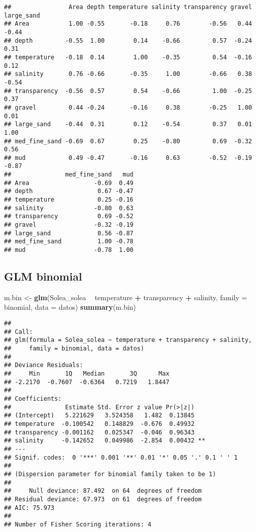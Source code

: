 \documentclass[
]{book}
\newenvironment{Shaded}{\begin{snugshade}}{\end{snugshade}}
\newcommand{\DataTypeTok}[1]{\textcolor[rgb]{0.13,0.29,0.53}{#1}}
\newcommand{\KeywordTok}[1]{\textcolor[rgb]{0.13,0.29,0.53}{\textbf{#1}}}
\newcommand{\NormalTok}[1]{#1}
\newcommand{\OperatorTok}[1]{\textcolor[rgb]{0.81,0.36,0.00}{\textbf{#1}}}
\newcommand{\StringTok}[1]{\textcolor[rgb]{0.31,0.60,0.02}{#1}}
\begin{document}
\begin{verbatim}
##                Area depth temperature salinity transparency gravel large_sand
## Area           1.00 -0.55       -0.18     0.76        -0.56   0.44      -0.44
## depth         -0.55  1.00        0.14    -0.66         0.57  -0.24       0.31
## temperature   -0.18  0.14        1.00    -0.35         0.54  -0.16       0.12
## salinity       0.76 -0.66       -0.35     1.00        -0.66   0.38      -0.54
## transparency  -0.56  0.57        0.54    -0.66         1.00  -0.25       0.37
## gravel         0.44 -0.24       -0.16     0.38        -0.25   1.00       0.01
## large_sand    -0.44  0.31        0.12    -0.54         0.37   0.01       1.00
## med_fine_sand -0.69  0.67        0.25    -0.80         0.69  -0.32       0.56
## mud            0.49 -0.47       -0.16     0.63        -0.52  -0.19      -0.87
##               med_fine_sand   mud
## Area                  -0.69  0.49
## depth                  0.67 -0.47
## temperature            0.25 -0.16
## salinity              -0.80  0.63
## transparency           0.69 -0.52
## gravel                -0.32 -0.19
## large_sand             0.56 -0.87
## med_fine_sand          1.00 -0.78
## mud                   -0.78  1.00
\end{verbatim}

\hypertarget{glm-binomial}{%
\subsection{GLM binomial}\label{glm-binomial}}

\begin{Shaded}
\begin{Highlighting}[]
\NormalTok{m.bin <-}\StringTok{ }\KeywordTok{glm}\NormalTok{(Solea_solea }\OperatorTok{~}\StringTok{ }\NormalTok{temperature }\OperatorTok{+}\StringTok{ }\NormalTok{transparency }\OperatorTok{+}\StringTok{ }\NormalTok{salinity, }\DataTypeTok{family =}\NormalTok{ binomial, }\DataTypeTok{data =}\NormalTok{ datos)}
\KeywordTok{summary}\NormalTok{(m.bin)}
\end{Highlighting}
\end{Shaded}

\begin{verbatim}
## 
## Call:
## glm(formula = Solea_solea ~ temperature + transparency + salinity, 
##     family = binomial, data = datos)
## 
## Deviance Residuals: 
##     Min       1Q   Median       3Q      Max  
## -2.2170  -0.7607  -0.6364   0.7219   1.8447  
## 
## Coefficients:
##               Estimate Std. Error z value Pr(>|z|)   
## (Intercept)   5.221629   3.524358   1.482  0.13845   
## temperature  -0.100542   0.148829  -0.676  0.49932   
## transparency -0.001162   0.025347  -0.046  0.96343   
## salinity     -0.142652   0.049986  -2.854  0.00432 **
## ---
## Signif. codes:  0 '***' 0.001 '**' 0.01 '*' 0.05 '.' 0.1 ' ' 1
## 
## (Dispersion parameter for binomial family taken to be 1)
## 
##     Null deviance: 87.492  on 64  degrees of freedom
## Residual deviance: 67.973  on 61  degrees of freedom
## AIC: 75.973
## 
## Number of Fisher Scoring iterations: 4
\end{verbatim}
\end{document}
